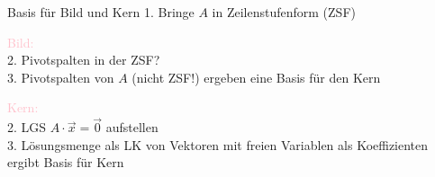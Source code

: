 \begin{KR}{Basis für Bild und Kern}
    1. Bringe $A$ in Zeilenstufenform (ZSF)

    \vspace{1mm}

    \begin{minipage}{0.45\linewidth}
        \textcolor{pink}{Bild:}\\
        2. Pivotspalten in der ZSF?\\
        3. Pivotspalten von $A$ (nicht ZSF!) ergeben eine Basis für den Kern
    \end{minipage}
    \hspace{3mm}
    \begin{minipage}{0.5\linewidth}
        \textcolor{pink}{Kern:}\\
        2. LGS $A \cdot \vec{x} = \overrightarrow{0}$ aufstellen\\
        3. Lösungsmenge als LK von Vektoren mit freien Variablen als Koeffizienten ergibt Basis für Kern
    \end{minipage}
\end{KR}



